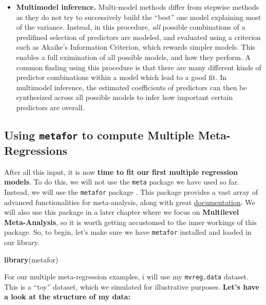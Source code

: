 \documentclass[]{book}
\newenvironment{Shaded}{\begin{snugshade}}{\end{snugshade}}
\newcommand{\KeywordTok}[1]{\textcolor[rgb]{0.13,0.29,0.53}{\textbf{#1}}}
\newcommand{\NormalTok}[1]{#1}
\begin{document}
\begin{itemize}
\item
  \textbf{Multimodel inference.} Multi-model methods differ from stepwise methods as they do not try to successively build the ``best'' one model explaining most of the variance. Instead, in this procedure, \emph{all} possible combinations of a predifined selection of predictors are modeled, and evaluated using a criterion such as Akaike's Information Criterion, which rewards simpler models. This enables a full eximination of all possible models, and how they perform. A common finding using this procedure is that there are many different kinds of predictor combinations within a model which lead to a good fit. In multimodel inference, the estimated coefficients of predictors can then be synthesized across all possible models to infer how important certain predictors are overall.
\end{itemize}

\hypertarget{using-metafor-to-compute-multiple-meta-regressions}{%
\subsection{\texorpdfstring{Using \texttt{metafor} to compute Multiple Meta-Regressions}{Using metafor to compute Multiple Meta-Regressions}}\label{using-metafor-to-compute-multiple-meta-regressions}}

After all this input, it is now \textbf{time to fit our first multiple regression models}. To do this, we will not use the \texttt{meta} package we have used so far. Instead, we will use the \texttt{metafor} package \citep{viechtbauer2010conducting}. This package provides a vast array of advanced functionalities for meta-analysis, along with great \href{http://www.metafor-project.org/doku.php/}{documentation}. We will also use this package in a later chapter where we focus on \textbf{Multilevel Meta-Analysis}, so it is worth getting accustomed to the inner workings of this package. So, to begin, let's make sure we have \texttt{metafor} installed and loaded in our library.

\begin{Shaded}
\begin{Highlighting}[]
\KeywordTok{library}\NormalTok{(metafor)}
\end{Highlighting}
\end{Shaded}

For our multiple meta-regression examples, i will use my \texttt{mvreg.data} dataset. This is a ``toy'' dataset, which we simulated for illustrative purposes. \textbf{Let's have a look at the structure of my data:}
\end{document}
